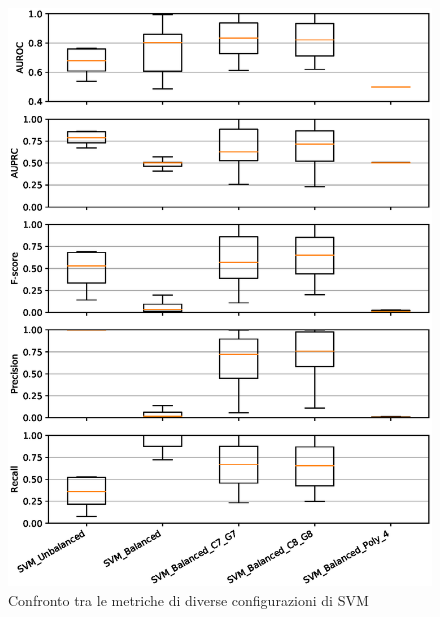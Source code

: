 \begin{figure}[hb]%
    \centering
    \includegraphics[scale = 0.80]{CC-SVM-level1}%
    \caption{Confronto tra le metriche di diverse configurazioni di SVM}%
    \label{figure:liv1.2}%
\end{figure}

\vspace*{\fill}

\vspace*{\fill}

